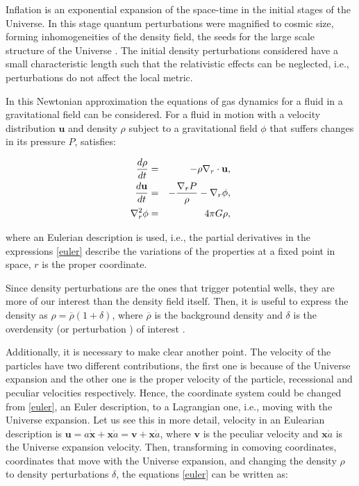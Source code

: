 Inflation is an exponential expansion of the space-time in the initial stages of the 
Universe. In this stage quantum perturbations were magnified to cosmic size, forming 
inhomogeneities of the density field, the seeds for the large scale structure of the Universe \cite{infla}. 
The initial density perturbations considered have a small characteristic length 
such that the relativistic effects can be neglected, i.e., perturbations do not affect the local
metric. 

In this Newtonian approximation the equations of gas dynamics for a fluid in a gravitational
field can be considered. For a fluid in motion with a velocity distribution $\textbf{u}$ and 
density $\rho$ subject to a gravitational field  $\phi$ that suffers changes in its pressure $P$, 
satisfies: 

\begin{eqnarray}
\frac{d \rho}{d t}&=& -\rho \nabla_r\cdot \textbf{u}, \nonumber\\
\frac{d \textbf{u}}{d t} &=& -\frac{\nabla_r P}{\rho}-\nabla_r\phi , \nonumber\\
\nabla_r^2 \phi & =& 4\pi G\rho ,
\label{euler}
\end{eqnarray}

where an Eulerian description is used, i.e., the partial derivatives in the 
expressions \ref{euler} describe the variations of the properties at a fixed 
point in space, $r$ is the proper coordinate. 

Since density perturbations are the ones that trigger potential wells, they are 
more of our interest than the density field itself.
Then, it is useful to express the density as $\rho = \overline{\rho}(1 + \delta)$, where
$\overline{\rho}$ is the background density and $\delta$ is the overdensity (or perturbation ) of interest \cite{Longair}. 


Additionally, it is necessary to make clear another point. The velocity of the particles have 
two different contributions, the first one is because of the Universe expansion and 
the other one is the proper velocity of the particle, recessional 
and peculiar velocities respectively. 
Hence, the coordinate system could be changed from \ref{euler},
an Euler description, to a Lagrangian one, i.e., moving with the Universe expansion.
Let us see this in more detail, velocity in an Eulearian description is 
$\textbf{u}= a\dot{\textbf{x}}+ \textbf{x}\dot{a} = \textbf{v}+\textbf{x}\dot{a}$, 
where $\textbf{v}$ is the peculiar velocity and $\textbf{x}\dot{a}$ is the Universe 
expansion velocity. 
Then, transforming in comoving coordinates, coordinates that move with the Universe
expansion, and changing the density $\rho$ to density perturbations $\delta$, the equations 
\ref{euler} can be written as: 

